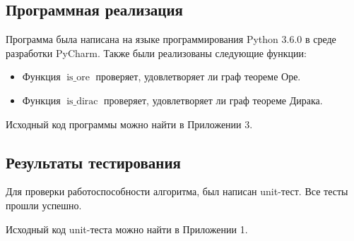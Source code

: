 \subsection{Программная реализация}
Программа была написана на языке программирования Python 3.6.0 в среде разработки PyCharm.
Также были реализованы следующие функции:
\begin{itemize}

    \item Функция $\operatorname{is\_ore}$ проверяет, удовлетворяет ли граф теореме Оре.
    \item Функция $\operatorname{is\_dirac}$ проверяет, удовлетворяет ли граф теореме Дирака.

\end{itemize}

Исходный код программы можно найти в Приложении 3.

\subsection{Результаты тестирования}
Для проверки работоспособности алгоритма, был написан unit-тест.
Все тесты прошли успешно.

Исходный код unit-теста можно найти в Приложении 1.

